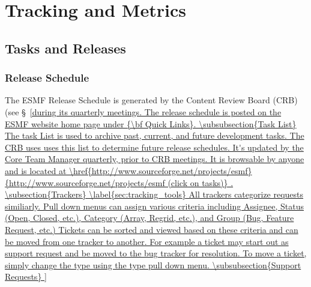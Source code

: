 
\section{Tracking and Metrics}
\label{sec:tracking}

\subsection{Tasks and Releases}
\label{sec:build}

\subsubsection{Release Schedule}
The ESMF Release Schedule is generated by the Content Review Board (CRB) (see \S~\ref{during its
quarterly meetings.  The release schedule is posted on the ESMF website home page under 
{\bf Quick Links}.

\subsubsection{Task List}

The task List is used to archive past, current, and future development tasks.  The CRB uses uses this list
to determine future release schedules.  It's updated by the Core Team Manager quarterly, prior to CRB meetings.  It is browsable by anyone and is located at
\href{http://www.sourceforge.net/projects/esmf}{http://www.sourceforge.net/projects/esmf (click on tasks)} .

\subsection{Trackers}
\label{sec:tracking_tools}

All trackers categorize requests similiarly. Pull down menus can assign various criteria including Assignee, Status (Open, Closed, etc.), Category (Array, Regrid, etc.), and Group (Bug, Feature Request, etc.)  Tickets can be sorted and viewed based on these criteria and can be moved from one tracker to another. For example a ticket may start out as support request and be moved to the bug tracker for resolution.  To move a ticket, simply change the type using the type pull down menu. 

\subsubsection{Support Requests}

}
